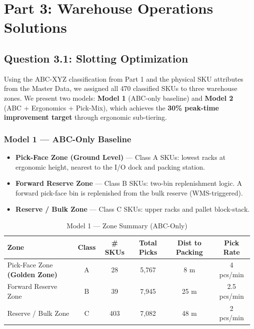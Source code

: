 \documentclass[11pt]{article}
\author{}
\date{}
\begin{document}
\section{Part 3: Warehouse Operations Solutions}\label{part3}

\subsection{Question 3.1: Slotting Optimization}\label{q3.1}

Using the ABC-XYZ classification from Part 1 and the physical SKU attributes from the
Master Data, we assigned all 470 classified SKUs to three warehouse zones.
We present two models: \textbf{Model 1} (ABC-only baseline) and
\textbf{Model 2} (ABC + Ergonomics + Pick-Mix), which achieves the
\textbf{30\% peak-time improvement target} through ergonomic sub-tiering.

\subsubsection{Model 1 --- ABC-Only Baseline}\label{model1}

\begin{itemize}
    \item \textbf{Pick-Face Zone (Ground Level)} --- Class A SKUs: lowest racks at
          ergonomic height, nearest to the I/O dock and packing station.
    \item \textbf{Forward Reserve Zone} --- Class B SKUs: two-bin replenishment logic.
          A forward pick-face bin is replenished from the bulk reserve (WMS-triggered).
    \item \textbf{Reserve / Bulk Zone} --- Class C SKUs: upper racks and pallet block-stack.
\end{itemize}

\begin{table}[H]
\centering
\caption{Model 1 --- Zone Summary (ABC-Only)}
\begin{tabular}{lccccc}
\toprule
Zone & Class & \# SKUs & Total Picks & Dist to Packing & Pick Rate \\
\midrule
        Pick-Face Zone \textbf{(Golden Zone)} & A & 28 & 5,767 & 8 m & 4 pcs/min \\
        Forward Reserve Zone & B & 39 & 7,945 & 25 m & 2.5 pcs/min \\
        Reserve / Bulk Zone & C & 403 & 7,082 & 48 m & 2 pcs/min \\
\bottomrule
\end{tabular}
\end{table}
\end{document}
